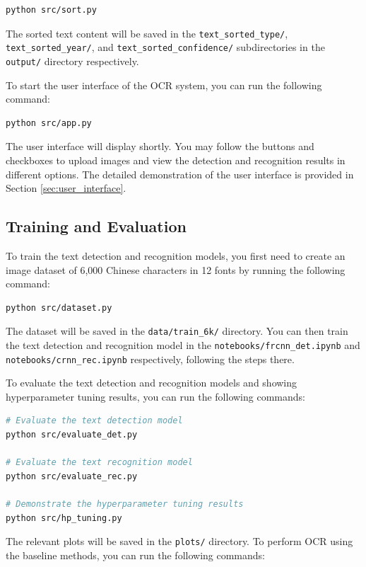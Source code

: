 \documentclass[12pt,twoside]{report}
\begin{document}
\begin{appendices}
\begin{lstlisting}[language=bash]
python src/sort.py
\end{lstlisting}

The sorted text content will be saved in the \texttt{text\_sorted\_type/}, \texttt{text\_sorted\_year/}, and \texttt{text\_sorted\_confidence/} subdirectories in the \texttt{output/} directory respectively.

To start the user interface of the OCR system, you can run the following command:

\begin{lstlisting}[language=bash]
python src/app.py
\end{lstlisting}

The user interface will display shortly. You may follow the buttons and checkboxes to upload images and view the detection and recognition results in different options. The detailed demonstration of the user interface is provided in Section \ref{sec:user_interface}.

\subsection{Training and Evaluation}
To train the text detection and recognition models, you first need to create an image dataset of 6,000 Chinese characters in 12 fonts by running the following command:

\begin{lstlisting}[language=bash]
python src/dataset.py
\end{lstlisting}

The dataset will be saved in the \texttt{data/train\_6k/} directory. You can then train the text detection and recognition model in the \texttt{notebooks/frcnn\_det.ipynb} and \texttt{notebooks/crnn\_rec.ipynb} respectively, following the steps there.

To evaluate the text detection and recognition models and showing hyperparameter tuning results, you can run the following commands:

\begin{lstlisting}[language=bash]
# Evaluate the text detection model
python src/evaluate_det.py

# Evaluate the text recognition model
python src/evaluate_rec.py

# Demonstrate the hyperparameter tuning results
python src/hp_tuning.py
\end{lstlisting}

The relevant plots will be saved in the \texttt{plots/} directory. To perform OCR using the baseline methods, you can run the following commands:


\end{appendices}
\end{document}
